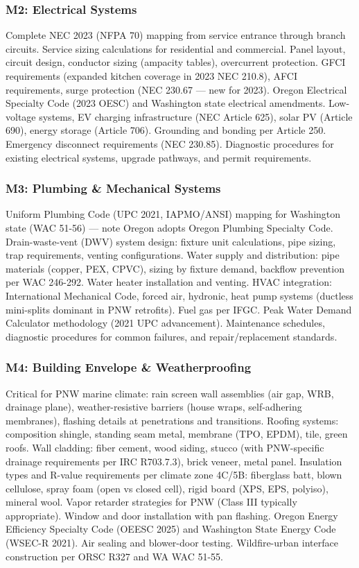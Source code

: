 \documentclass[11pt,letterpaper]{article}
\begin{document}
\subsubsection{M2: Electrical Systems}

Complete NEC 2023 (NFPA 70) mapping from service entrance through branch circuits. Service sizing calculations for residential and commercial. Panel layout, circuit design, conductor sizing (ampacity tables), overcurrent protection. GFCI requirements (expanded kitchen coverage in 2023 NEC 210.8), AFCI requirements, surge protection (NEC 230.67 --- new for 2023). Oregon Electrical Specialty Code (2023 OESC) and Washington state electrical amendments. Low-voltage systems, EV charging infrastructure (NEC Article 625), solar PV (Article 690), energy storage (Article 706). Grounding and bonding per Article 250. Emergency disconnect requirements (NEC 230.85). Diagnostic procedures for existing electrical systems, upgrade pathways, and permit requirements.

\subsubsection{M3: Plumbing \& Mechanical Systems}

Uniform Plumbing Code (UPC 2021, IAPMO/ANSI) mapping for Washington state (WAC 51-56) --- note Oregon adopts Oregon Plumbing Specialty Code. Drain-waste-vent (DWV) system design: fixture unit calculations, pipe sizing, trap requirements, venting configurations. Water supply and distribution: pipe materials (copper, PEX, CPVC), sizing by fixture demand, backflow prevention per WAC 246-292. Water heater installation and venting. HVAC integration: International Mechanical Code, forced air, hydronic, heat pump systems (ductless mini-splits dominant in PNW retrofits). Fuel gas per IFGC. Peak Water Demand Calculator methodology (2021 UPC advancement). Maintenance schedules, diagnostic procedures for common failures, and repair/replacement standards.

\subsubsection{M4: Building Envelope \& Weatherproofing}

Critical for PNW marine climate: rain screen wall assemblies (air gap, WRB, drainage plane), weather-resistive barriers (house wraps, self-adhering membranes), flashing details at penetrations and transitions. Roofing systems: composition shingle, standing seam metal, membrane (TPO, EPDM), tile, green roofs. Wall cladding: fiber cement, wood siding, stucco (with PNW-specific drainage requirements per IRC R703.7.3), brick veneer, metal panel. Insulation types and R-value requirements per climate zone 4C/5B: fiberglass batt, blown cellulose, spray foam (open vs closed cell), rigid board (XPS, EPS, polyiso), mineral wool. Vapor retarder strategies for PNW (Class III typically appropriate). Window and door installation with pan flashing. Oregon Energy Efficiency Specialty Code (OEESC 2025) and Washington State Energy Code (WSEC-R 2021). Air sealing and blower-door testing. Wildfire-urban interface construction per ORSC R327 and WA WAC 51-55.
\end{document}
